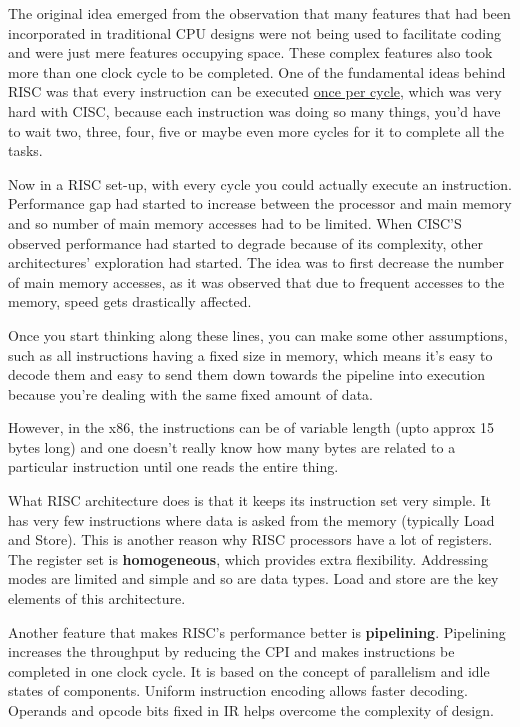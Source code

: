 \documentclass[conference]{IEEEtran}
\begin{document}
The original idea emerged from the observation that many features that had been incorporated in traditional CPU designs were not being used to facilitate coding and were just mere features occupying space. These complex features also took more than one clock cycle to be completed. One of the fundamental ideas behind RISC was that every instruction can be executed \underline{once per cycle}, which was very hard with CISC, because each instruction was doing so many things, you’d have to wait two, three, four, five or maybe even more cycles for it to complete all the tasks.

Now in a RISC set-up, with every cycle you could actually execute an instruction.  Performance gap had started to increase between the processor and main memory and so number of main memory accesses had to be limited. When CISC’S observed performance had started to degrade because of its complexity, other architectures’ exploration had started. The idea was to first decrease the number of main memory accesses, as it was observed that due to frequent accesses to the memory, speed gets drastically affected. 

Once you start thinking along these lines, you can make some other assumptions, such as all instructions having a fixed size in memory, which means it’s easy to decode them and easy to send them down towards the pipeline into execution because you’re dealing with the same fixed amount of data.

However, in the x86, the instructions can be of variable length (upto approx 15 bytes long) and one doesn’t really know how many bytes are related to a particular instruction until one reads the entire thing.

What RISC architecture does is that it keeps its instruction set very simple. It has very few instructions where data is asked from the memory (typically Load and Store). This is another reason why RISC processors have a lot of registers. The register set is \textbf{homogeneous}, which provides extra flexibility. Addressing modes are limited and simple and so are data types. Load and store are the key elements of this architecture. 

Another feature that makes RISC’s performance better is \textbf{pipelining}. Pipelining increases the throughput by reducing the CPI and makes instructions be completed in one clock cycle. It is based on the concept of parallelism and idle states of components. Uniform instruction encoding allows faster decoding. Operands and opcode bits fixed in IR helps overcome the complexity of design. 
\end{document}
